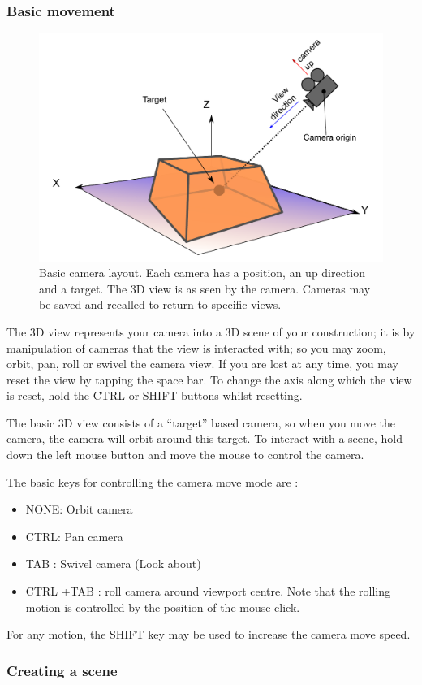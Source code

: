 \documentclass[10pt]{article}
\begin{document}
\subsubsection{Basic movement}
\begin{figure}

 \includegraphics[width=0.45 \textwidth,keepaspectratio=true]{./figures/camera.pdf}

 \caption{Basic camera layout. Each camera has a position, an up direction and a target. The 3D view is as seen by the camera. Cameras may be saved and recalled to return to specific views.}
 \label{fig:camera-basics}
\end{figure}
The 3D view represents your camera into a 3D scene of your construction; it is by manipulation of cameras that the view is interacted with; so you may zoom, orbit, pan, roll or swivel the camera view. If you are lost at any time, you may reset the view by tapping the space bar. To change the axis along which the view is reset, hold the CTRL or SHIFT buttons whilst resetting.  

The basic 3D view consists of a ``target'' based camera, so when you move the camera, the camera will orbit around this target. To interact with a scene, hold down the left mouse button and move the mouse to control the camera.  


The basic keys for controlling the camera move mode are :  
\begin{itemize}
\item  NONE: Orbit camera 
\item CTRL: Pan camera 
\item  TAB : Swivel camera (Look about)
\item  CTRL +TAB : roll camera around viewport centre. Note that the rolling motion is controlled by the position of the mouse click.

\end{itemize}
 For any motion, the SHIFT key may be used to increase the camera move speed. 
\subsubsection{Creating a scene}
\end{document}
